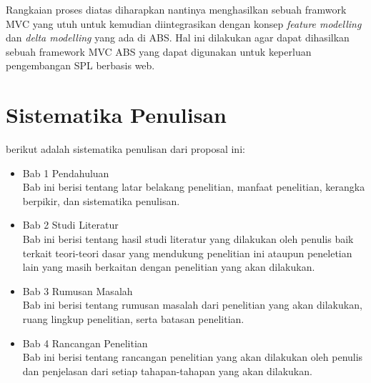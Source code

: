 \noindent
Rangkaian proses diatas diharapkan nantinya menghasilkan sebuah framwork MVC yang utuh untuk kemudian diintegrasikan dengan konsep \textit{feature modelling} dan \textit{delta modelling} yang ada di ABS. Hal ini dilakukan agar dapat dihasilkan sebuah framework MVC ABS yang dapat digunakan untuk keperluan pengembangan SPL berbasis web.

\section{Sistematika Penulisan}
berikut adalah sistematika penulisan dari proposal ini:
\begin{itemize}
    \item Bab 1 Pendahuluan \\
    Bab ini berisi tentang latar belakang penelitian, manfaat penelitian, kerangka berpikir, dan sistematika penulisan.
    \item Bab 2 Studi Literatur \\
    Bab ini berisi tentang hasil studi literatur yang dilakukan oleh penulis baik terkait teori-teori dasar yang mendukung penelitian ini ataupun peneletian lain yang masih berkaitan dengan penelitian yang akan dilakukan.
    \item Bab 3 Rumusan Masalah \\
    Bab ini berisi tentang rumusan masalah dari penelitian yang akan dilakukan, ruang lingkup penelitian, serta batasan penelitian.
    \item Bab 4 Rancangan Penelitian \\
    Bab ini berisi tentang rancangan penelitian yang akan dilakukan oleh penulis dan penjelasan dari setiap tahapan-tahapan yang akan dilakukan.
\end{itemize}